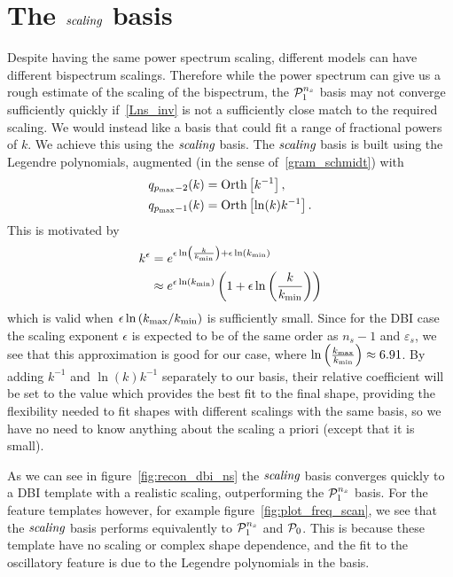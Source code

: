 \section{The $\textit{scaling}$ basis}\label{sec:scaling_definition}
    Despite having the same power spectrum scaling,
    different models can have different bispectrum scalings.
    Therefore while the power spectrum can give us a
    rough estimate of the scaling of the bispectrum,
    the $\mathcal{P}^{n_s}_1$ basis may not converge sufficiently quickly if~\eqref{Lns_inv}
    is not a sufficiently close match to the required scaling.
    We would instead like a basis that could fit
    a range of fractional powers of $k$.
    We achieve this using the $\textit{scaling}$ basis.
    The $\textit{scaling}$ basis is built using the Legendre polynomials,
    augmented (in the sense of~\eqref{gram_schmidt})
    with
    \begin{align}\label{scaling_basis_definition}
        q_{p_\text{max}-2}(k) &= \text{Orth}\left[{k^{-1}}\right],\\
        q_{p_\text{max}-1}(k) &= \text{Orth}\left[{\ln(k)k^{-1}}\right].
    \end{align}
    This is motivated by
    \begin{align}
        k^\epsilon &= e^{\epsilon\ln\left(\frac{k}{{k_\text{min}}}\right)+\epsilon\ln({k_\text{min}})}\\
                   &\approx e^{\epsilon\ln\left({k_\text{min}}\right)}
                      \left(1+\epsilon\ln\left(\frac{k}{{k_\text{min}}}\right)\right)
    \end{align}
    which is valid when $\epsilon\ln\left({k_\text{max}}/{k_\text{min}}\right)$ is
    sufficiently small.
    Since for the DBI case the scaling exponent $\epsilon$ is expected to be of the
    same order as $n_s-1$ and $\varepsilon_s$, we see that this
    approximation is good for our case,
    where $\ln\left(\frac{{k_\text{max}}}{{k_\text{min}}}\right)\approx6.91$.
    By adding $k^{-1}$ and $\ln(k)k^{-1}$ separately to our
    basis, their relative coefficient will be set to the value
    which provides the best fit to the final shape,
    providing the flexibility needed to fit shapes with different
    scalings with the same basis, so we have no need to know anything
    about the scaling a priori (except that it is small).

    As we can see in figure~\ref{fig:recon_dbi_ns} the $\textit{scaling}$ basis
    converges quickly to a DBI template with a realistic scaling, outperforming
    the $\mathcal{P}^{n_s}_1$ basis. For the feature templates however,
    for example figure~\ref{fig:plot_freq_scan},
    we see that the $\textit{scaling}$ basis performs equivalently to $\mathcal{P}^{n_s}_1$
    and $\mathcal{P}_0$.
    This is because these template have no scaling or complex shape dependence,
    and the fit to the oscillatory feature is due to the Legendre polynomials
    in the basis.

